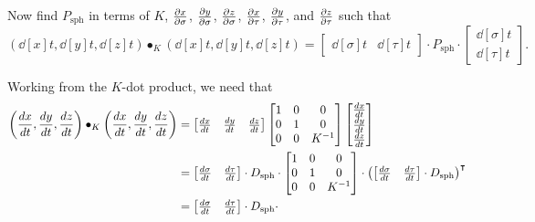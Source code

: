 \documentclass{ximera}
\begin{document}
\begin{problem}
  Now find $P_\mathrm{sph}$ in terms of $K$, $\pp[x]{\sigma}$, $\pp[y]{\sigma}$,
  $\pp[z]{\sigma}$, $\pp[x]{\tau}$, $\pp[y]{\tau}$, and $\pp[z]{\tau}$
  such that
  \[
  \left(\dd[x]{t}, \dd[y]{t}, \dd[z]{t}\right)\bullet_K
  \left(\dd[x]{t}, \dd[y]{t}, \dd[z]{t}\right)
  =
  \begin{bmatrix}
    \dd[\sigma]{t} &  \dd[\tau]{t}
  \end{bmatrix}
  \cdot P_\mathrm{sph}
  \cdot
  \begin{bmatrix}
    \dd[\sigma]{t} \\  \dd[\tau]{t}
  \end{bmatrix}.
  \]
  \begin{freeResponse}
    Working from the $K$-dot product, we need that
    \begin{align*}
    \left(\dd[x]{t}, \dd[y]{t}, \dd[z]{t}\right)\bullet_K
    \left(\dd[x]{t}, \dd[y]{t}, \dd[z]{t}\right)
    &=
    \begin{bmatrix}
      \dd[x]{t} & \dd[y]{t} & \dd[z]{t}
    \end{bmatrix}
    \begin{bmatrix}
      1 & 0 & 0\\
      0 & 1 & 0\\
      0 & 0 & K^{-1}
    \end{bmatrix}
    \begin{bmatrix}
      \dd[x]{t} \\ \dd[y]{t} \\ \dd[z]{t}
    \end{bmatrix}\\
    &=
    \begin{bmatrix}
      \frac{d\sigma}{dt} & \frac{d\tau}{dt}
    \end{bmatrix}\cdot D_{\mathrm{sph}}\cdot
    \begin{bmatrix}
      1 & 0 & 0\\
      0 & 1 & 0\\
    0 & 0 & K^{-1}
    \end{bmatrix}
    \cdot
    \left(
    \begin{bmatrix}
      \frac{d\sigma}{dt} & \frac{d\tau}{dt}
    \end{bmatrix}\cdot D_{\mathrm{sph}}
    \right)^\transpose\\
    &=
    \begin{bmatrix}
      \frac{d\sigma}{dt} & \frac{d\tau}{dt}
    \end{bmatrix}\cdot D_{\mathrm{sph}}\cdot

\end{align*}
\end{freeResponse}
\end{problem}
\end{document}
